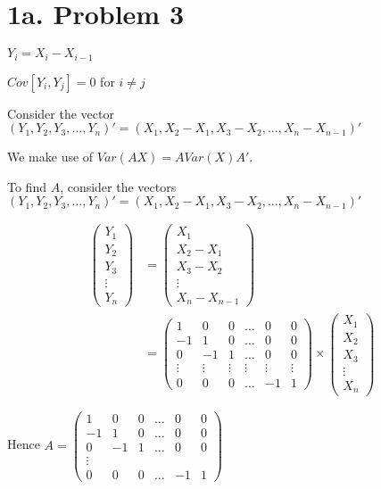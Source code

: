 \documentclass[a4paper]{article}
\begin{document}
\section*{1a. Problem 3}
$Y_i = X_i-X_{i-1}$

$Cov[Y_i,Y_j]=0$ for $i \neq j$

Consider the vector $(Y_1, Y_2, Y_3, \dots, Y_n)' = (X_1,X_2-X_1,X_3-X_2, \dots, X_n-X_{n-1})'$ 

We make use of $Var(AX) = AVar(X)A'$.

To find $A$, consider the vectors $(Y_1, Y_2, Y_3, \dots, Y_n)' = (X_1,X_2-X_1,X_3-X_2, \dots, X_n-X_{n-1})'$ 

\begin{align*}
\begin{pmatrix}
Y_1\\
Y_2\\
Y_3\\
\vdots\\
Y_n
\end{pmatrix} &= \begin{pmatrix}
X_1\\
X_2-X_1\\
X_3-X_2\\
\vdots\\
X_n-X_{n-1}
\end{pmatrix}\\
&= \begin{pmatrix}1 & 0 & 0 & \dots & 0 & 0\\
-1 & 1 & 0 & \dots & 0 & 0\\
0 & -1 & 1 & \dots & 0 & 0\\
\vdots & \vdots & \vdots & \vdots & \vdots & \vdots\\
0 & 0 & 0 & \dots & -1 & 1
\end{pmatrix} \times \begin{pmatrix}
X_1\\
X_2\\
X_3\\
\vdots\\
X_n
\end{pmatrix}
\end{align*}

Hence $A=\begin{pmatrix}1 & 0 & 0 & \dots & 0 & 0\\
-1 & 1 & 0 & \dots & 0 & 0\\
0 & -1 & 1 & \dots & 0 & 0\\
\vdots \\
0 & 0 & 0 & \dots & -1 & 1
\end{pmatrix}$
\end{document}
